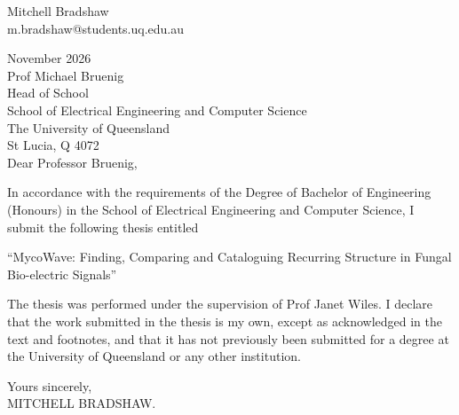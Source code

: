 \newpage
\thispagestyle{empty}
\begin{flushright}
	Mitchell Bradshaw\\
	m.bradshaw@students.uq.edu.au\\
	\medskip
\end{flushright}
\begin{flushleft}
   November 2026 \\
  \bigskip\bigskip
  Prof Michael Bruenig\\
  Head of School\\
  School of Electrical Engineering and Computer Science\\
  The University of Queensland\\
  St Lucia, Q 4072\\
  \bigskip\bigskip
  Dear Professor Bruenig,
\end{flushleft}

In accordance with the requirements of the Degree of Bachelor of Engineering (Honours) in the School of Electrical Engineering and Computer Science, I submit the following thesis entitled

\begin{center}
``MycoWave: Finding, Comparing and Cataloguing Recurring Structure in Fungal Bio-electric Signals''
\end{center}

The thesis was performed under the supervision of Prof Janet Wiles. I declare that the work submitted in the thesis is my own, except as acknowledged in the text and footnotes, and that it has not previously been submitted for a degree at the University of Queensland or any other institution.

\begin{flushright}
	Yours sincerely,\\
	\medskip
	MITCHELL BRADSHAW.
\end{flushright}
